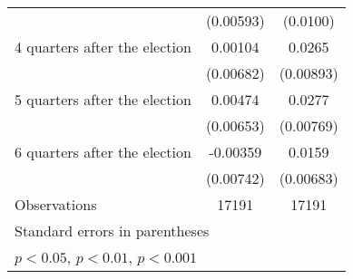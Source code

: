 \begin{table}[htbp]
\begin{tabular}{l*{2}{c}}
                    &   (0.00593)         &    (0.0100)         \\
[1em]
 4 quarters after the election&     0.00104         &      0.0265\sym{**} \\
                    &   (0.00682)         &   (0.00893)         \\
[1em]
 5 quarters after the election&     0.00474         &      0.0277\sym{***}\\
                    &   (0.00653)         &   (0.00769)         \\
[1em]
 6 quarters after the election&    -0.00359         &      0.0159\sym{*}  \\
                    &   (0.00742)         &   (0.00683)         \\
\hline
Observations        &       17191         &       17191         \\
\hline\hline
\multicolumn{3}{l}{\footnotesize Standard errors in parentheses}\\
\multicolumn{3}{l}{\footnotesize \sym{*} \(p<0.05\), \sym{**} \(p<0.01\), \sym{***} \(p<0.001\)}\\
\end{tabular}
\end{table}

